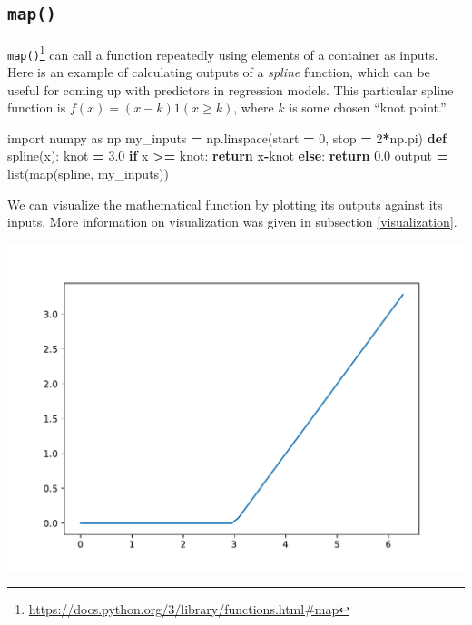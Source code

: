 \documentclass[
  12pt,
]{krantz}
\makeatletter
\newenvironment{Shaded}{\begin{snugshade}}{\end{snugshade}}
\newcommand{\BuiltInTok}[1]{#1}
\newcommand{\ControlFlowTok}[1]{\textcolor[rgb]{0.27,0.27,0.27}{\textbf{#1}}}
\newcommand{\DecValTok}[1]{\textcolor[rgb]{0.06,0.06,0.06}{#1}}
\newcommand{\FloatTok}[1]{\textcolor[rgb]{0.06,0.06,0.06}{#1}}
\newcommand{\ImportTok}[1]{#1}
\newcommand{\KeywordTok}[1]{\textcolor[rgb]{0.27,0.27,0.27}{\textbf{#1}}}
\newcommand{\NormalTok}[1]{#1}
\newcommand{\OperatorTok}[1]{\textcolor[rgb]{0.43,0.43,0.43}{\textbf{#1}}}
\renewcommand{\href}[2]{#2\footnote{\url{#1}}}
\newenvironment{kframe}{%
\medskip{}
\setlength{\fboxsep}{.8em}
 \def\at@end@of@kframe{}%
 \ifinner\ifhmode%
  \def\at@end@of@kframe{\end{minipage}}%
  \begin{minipage}{\columnwidth}%
 \fi\fi%
 \def\FrameCommand##1{\hskip\@totalleftmargin \hskip-\fboxsep
 \colorbox{shadecolor}{##1}\hskip-\fboxsep
     \hskip-\linewidth \hskip-\@totalleftmargin \hskip\columnwidth}%
 \MakeFramed {\advance\hsize-\width
   \@totalleftmargin\z@ \linewidth\hsize
   \@setminipage}}%
 {\par\unskip\endMakeFramed%
 \at@end@of@kframe}
\renewenvironment{Shaded}{\begin{kframe}}{\end{kframe}}
\makeatother
\begin{document}
\hypertarget{map}{%
\subsection{\texorpdfstring{\texttt{map()}}{map()}}\label{map}}

\href{https://docs.python.org/3/library/functions.html\#map}{\texttt{map()}} can call a function repeatedly using elements of a container as inputs. Here is an example of calculating outputs of a \emph{spline} function, which can be useful for coming up with predictors in regression models. This particular spline function is \(f(x) = (x-k)1(x \ge k)\), where \(k\) is some chosen ``knot point.''

\begin{Shaded}
\begin{Highlighting}[]
\ImportTok{import}\NormalTok{ numpy }\ImportTok{as}\NormalTok{ np}
\NormalTok{my\_inputs }\OperatorTok{=}\NormalTok{ np.linspace(start }\OperatorTok{=} \DecValTok{0}\NormalTok{, stop }\OperatorTok{=} \DecValTok{2}\OperatorTok{*}\NormalTok{np.pi)}
\KeywordTok{def}\NormalTok{ spline(x):}
\NormalTok{    knot }\OperatorTok{=} \FloatTok{3.0}
    \ControlFlowTok{if}\NormalTok{ x }\OperatorTok{\textgreater{}=}\NormalTok{ knot:}
        \ControlFlowTok{return}\NormalTok{ x}\OperatorTok{{-}}\NormalTok{knot}
    \ControlFlowTok{else}\NormalTok{:}
        \ControlFlowTok{return} \FloatTok{0.0}
\NormalTok{output }\OperatorTok{=} \BuiltInTok{list}\NormalTok{(}\BuiltInTok{map}\NormalTok{(spline, my\_inputs))}
\end{Highlighting}
\end{Shaded}

We can visualize the mathematical function by plotting its outputs against its inputs. More information on visualization was given in subsection \ref{visualization}.

\includegraphics[width=0.7\linewidth]{r_and_python_book_files/figure-latex/unnamed-chunk-226-1}
\end{document}

